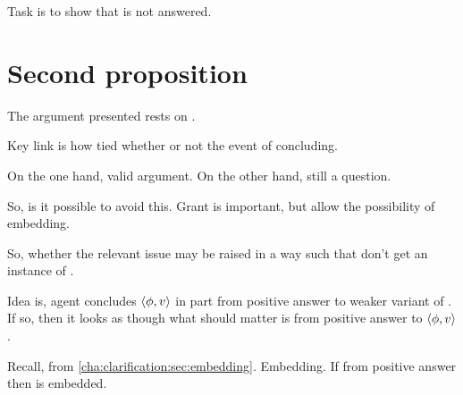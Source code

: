 \begin{note}
  Task is to show that \qzS{} is not answered.
\end{note}

\section{Second proposition}
\label{sec:flexible-argument}

\begin{note}
  The argument presented rests on \qzS{}.

  Key link is how \qzS{} tied whether or not \fc{} the event of concluding.

  On the one hand, valid argument.
  On the other hand, still a question.

  So, is it possible to avoid this.
  Grant \fc{} is important, but allow the possibility of embedding.

  So, whether the relevant issue may be raised in a way such that don't get an instance of \qzS{}.

  Idea is, agent concludes \(\langle \phi, v \rangle\) in part from positive answer to weaker variant of \qzS{}.
  If so, then it looks as though what should matter is \support{} from positive answer to \(\langle \phi, v \rangle\).

  Recall, from \autoref{cha:clarification:sec:embedding}.
  Embedding.
  If \support{} from positive answer then \support{} is embedded.
\end{note}


